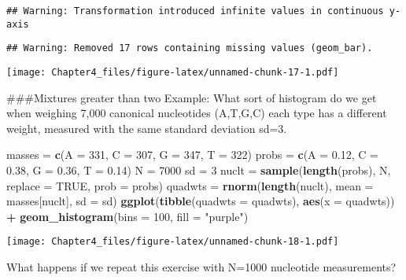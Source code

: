 \documentclass[]{article}
\newenvironment{Shaded}{\begin{snugshade}}{\end{snugshade}}
\newcommand{\DataTypeTok}[1]{\textcolor[rgb]{0.13,0.29,0.53}{#1}}
\newcommand{\DecValTok}[1]{\textcolor[rgb]{0.00,0.00,0.81}{#1}}
\newcommand{\FloatTok}[1]{\textcolor[rgb]{0.00,0.00,0.81}{#1}}
\newcommand{\KeywordTok}[1]{\textcolor[rgb]{0.13,0.29,0.53}{\textbf{#1}}}
\newcommand{\NormalTok}[1]{#1}
\newcommand{\OperatorTok}[1]{\textcolor[rgb]{0.81,0.36,0.00}{\textbf{#1}}}
\newcommand{\OtherTok}[1]{\textcolor[rgb]{0.56,0.35,0.01}{#1}}
\newcommand{\StringTok}[1]{\textcolor[rgb]{0.31,0.60,0.02}{#1}}
\begin{document}
\begin{verbatim}
## Warning: Transformation introduced infinite values in continuous y-axis
\end{verbatim}

\begin{verbatim}
## Warning: Removed 17 rows containing missing values (geom_bar).
\end{verbatim}

\texttt{[image: Chapter4\_files/figure-latex/unnamed-chunk-17-1.pdf]}

\#\#\#Mixtures greater than two Example: What sort of histogram do we
get when weighing 7,000 canonical nucleotides (A,T,G,C) each type has a
different weight, measured with the same standard deviation sd=3.

\begin{Shaded}
\begin{Highlighting}[]
\NormalTok{masses =}\StringTok{ }\KeywordTok{c}\NormalTok{(}\DataTypeTok{A =}  \DecValTok{331}\NormalTok{, }\DataTypeTok{C =}  \DecValTok{307}\NormalTok{, }\DataTypeTok{G =}  \DecValTok{347}\NormalTok{, }\DataTypeTok{T =}  \DecValTok{322}\NormalTok{)}
\NormalTok{probs  =}\StringTok{ }\KeywordTok{c}\NormalTok{(}\DataTypeTok{A =} \FloatTok{0.12}\NormalTok{, }\DataTypeTok{C =} \FloatTok{0.38}\NormalTok{, }\DataTypeTok{G =} \FloatTok{0.36}\NormalTok{, }\DataTypeTok{T =} \FloatTok{0.14}\NormalTok{)}
\NormalTok{N  =}\StringTok{ }\DecValTok{7000}
\NormalTok{sd =}\StringTok{ }\DecValTok{3}
\NormalTok{nuclt   =}\StringTok{ }\KeywordTok{sample}\NormalTok{(}\KeywordTok{length}\NormalTok{(probs), N, }\DataTypeTok{replace =} \OtherTok{TRUE}\NormalTok{, }\DataTypeTok{prob =}\NormalTok{ probs)}
\NormalTok{quadwts =}\StringTok{ }\KeywordTok{rnorm}\NormalTok{(}\KeywordTok{length}\NormalTok{(nuclt),}
                \DataTypeTok{mean =}\NormalTok{ masses[nuclt],}
                \DataTypeTok{sd   =}\NormalTok{ sd)}
\KeywordTok{ggplot}\NormalTok{(}\KeywordTok{tibble}\NormalTok{(}\DataTypeTok{quadwts =}\NormalTok{ quadwts), }\KeywordTok{aes}\NormalTok{(}\DataTypeTok{x =}\NormalTok{ quadwts)) }\OperatorTok{+}
\StringTok{  }\KeywordTok{geom_histogram}\NormalTok{(}\DataTypeTok{bins =} \DecValTok{100}\NormalTok{, }\DataTypeTok{fill =} \StringTok{"purple"}\NormalTok{)}
\end{Highlighting}
\end{Shaded}

\texttt{[image: Chapter4\_files/figure-latex/unnamed-chunk-18-1.pdf]}

What happens if we repeat this exercise with N=1000 nucleotide
measurements?
\end{document}
